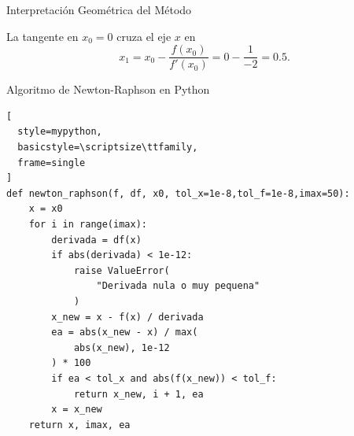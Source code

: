 \documentclass[../../main.tex]{subfiles}
\begin{document}
\begin{frame}{Interpretación Geométrica del Método}

\centering


\vspace{0.4em}

La tangente en \(x_0=0\) cruza el eje \(x\) en
\[
x_1
=
x_0-\frac{f(x_0)}{f'(x_0)}
=
0-\frac{1}{-2}
=
0.5.
\]

\end{frame}



\begin{frame}[fragile]{Algoritmo de Newton-Raphson en Python}

\begin{lstlisting}[
  style=mypython,
  basicstyle=\scriptsize\ttfamily,
  frame=single
]
def newton_raphson(f, df, x0, tol_x=1e-8,tol_f=1e-8,imax=50):
    x = x0
    for i in range(imax):
        derivada = df(x)
        if abs(derivada) < 1e-12:
            raise ValueError(
                "Derivada nula o muy pequena"
            )
        x_new = x - f(x) / derivada
        ea = abs(x_new - x) / max(
            abs(x_new), 1e-12
        ) * 100
        if ea < tol_x and abs(f(x_new)) < tol_f:
            return x_new, i + 1, ea
        x = x_new
    return x, imax, ea
\end{lstlisting}

\end{frame}
\end{document}
